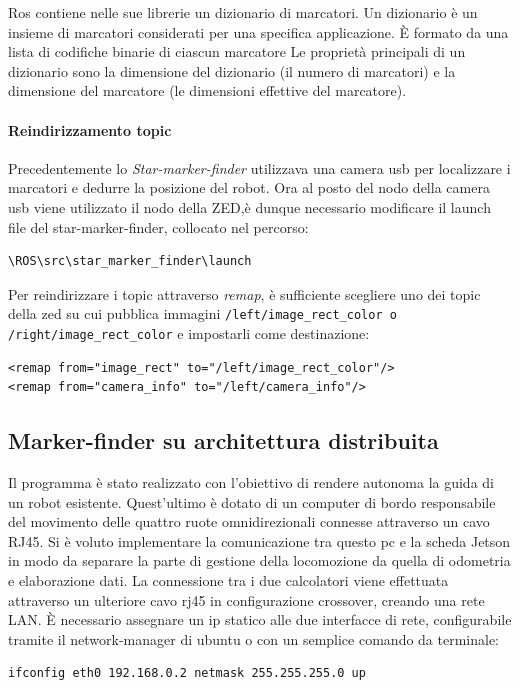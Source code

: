 \documentclass[a4paper]{article}
\begin{document}
Ros contiene nelle sue librerie un dizionario di marcatori. Un dizionario è un insieme di marcatori considerati per una specifica applicazione. È formato da  una lista di codifiche binarie di ciascun marcatore
Le proprietà principali di un dizionario sono la dimensione del dizionario (il numero di marcatori) e la dimensione del marcatore (le dimensioni effettive del marcatore).
\paragraph{Reindirizzamento topic}
Precedentemente lo \textit{Star-marker-finder} utilizzava una camera usb per localizzare i marcatori e dedurre la posizione del robot. 
Ora al posto del nodo della camera usb viene utilizzato il nodo della ZED,è dunque necessario modificare il launch file del star-marker-finder, collocato nel percorso:
\begin{verbatim}
\ROS\src\star_marker_finder\launch
\end{verbatim}
Per reindirizzare i topic attraverso \textit{remap}, è sufficiente scegliere uno dei topic della zed su cui pubblica immagini 
\verb|/left/image_rect_color o /right/image_rect_color| e impostarli come destinazione:
\begin{verbatim}
<remap from="image_rect" to="/left/image_rect_color"/>
<remap from="camera_info" to="/left/camera_info"/>
\end{verbatim}


\subsection{Marker-finder su architettura distribuita}
Il programma è stato realizzato con l'obiettivo di rendere autonoma la guida di un robot esistente. 
Quest'ultimo è dotato di un computer di bordo responsabile del movimento delle quattro ruote omnidirezionali connesse attraverso un cavo RJ45.
Si è voluto implementare la comunicazione tra questo pc e la scheda Jetson in modo da separare la parte di gestione della locomozione da quella di odometria e elaborazione dati.
La connessione tra i due calcolatori viene effettuata attraverso un ulteriore cavo rj45 in configurazione crossover, creando una rete LAN.
È  necessario assegnare un ip statico alle due interfacce di rete, configurabile tramite il network-manager di ubuntu o con un semplice comando da terminale:
\begin{verbatim}
ifconfig eth0 192.168.0.2 netmask 255.255.255.0 up
\end{verbatim}
\end{document}
